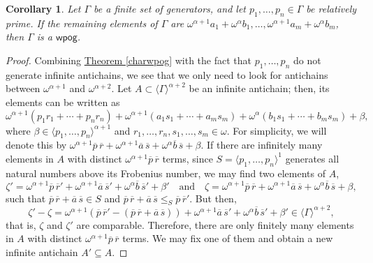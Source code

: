 \documentclass[reqno]{amsart}
\newtheorem{corollary}[theorem]{Corollary}
\theoremstyle{definition}
\theoremstyle{definition}
\theoremstyle{plain} %
\begin{document}
\begin{corollary}
    Let $\Gamma$ be a finite set of generators, and let $ p_1, \dots,p_n \in \Gamma$ be relatively prime. If the remaining elements of $\Gamma$ are $\omega^{\alpha+1} a_1 + \omega^{\alpha} b_1, \dots, \omega^{\alpha+1} a_m + \omega^{\alpha} b_m$, then $\Gamma$ is a $\mathsf{wpog}$.
\end{corollary}
\begin{proof}
    Combining \hyperref[charwpog]{Theorem \ref{charwpog}} with the fact that $p_1, \dots,p_n$ do not generate infinite antichains, we see that we only need to look for antichains between $\omega^{\alpha+1}$ and $\omega^{\alpha+2}$. Let $A \subset \langle \Gamma \rangle^{\alpha+2}$ be an infinite antichain; then, its elements can be written as \[ \omega^{\alpha+1}(p_1 r_1 + \cdots + p_n r_n)+\omega^{\alpha+1}(a_1 s_1 + \cdots + a_m s_m)+\omega^{\alpha}(b_1 s_1 + \cdots + b_m s_m)+\beta,\]where $\beta \in \langle p_1,\dots,p_n \rangle^{\alpha+1}$ and $r_1,\dots,r_n, s_1,\dots,s_m \in \omega$. For simplicity, we will denote this by \( \omega^{\alpha+1}\overline{p}\,\overline{r}+\omega^{\alpha+1}\overline{a}\,\overline{s}+\omega^{\alpha}\overline{b}\,\overline{s}+\beta\). If there are infinitely many elements in $A$ with distinct $\omega^{\alpha+1}\overline{p}\,\overline{r}$ terms, since  $S=\langle p_1,\dots,p_n\rangle^{1}$  generates all natural numbers above its Frobenius number, we may find two elements of $A$, \[ \zeta'=\omega^{\alpha+1}\overline{p}\,\overline{r}'+ \omega^{\alpha+1}\overline{a}\,\overline{s}' + \omega^{\alpha}\overline{b}\,\overline{s}' + \beta'\quad\text{and}\quad\zeta=\omega^{\alpha+1}\overline{p}\,\overline{r}+\omega^{\alpha+1}\overline{a}\,\overline{s}+ \omega^{\alpha}\overline{b}\,\overline{s}+\beta,\]such that \(\overline{p}\,\overline{r}+\overline{a}\,\overline{s} \in S\) and $ \overline{p}\,\overline{r}+\overline{a}\,\overline{s}\leq_{S} \overline{p}\,\overline{r}'$. But then, \[ \zeta' - \zeta=\omega^{\alpha+1}(\overline{p}\,\overline{r}'-(\overline{p}\,\overline{r}+\overline{a}\,\overline{s}))+ \omega^{\alpha+1}\overline{a}\,\overline{s}'+ \omega^{\alpha}\overline{b}\,\overline{s}'+ \beta'\in \langle \Gamma \rangle^{\alpha+2},\]that is, $\zeta$ and $\zeta'$ are comparable. Therefore, there are only finitely many elements in $A$ with distinct $\omega^{\alpha+1}\overline{p}\,\overline{r}$ terms. We may fix one of them and obtain a new infinite antichain $A' \subseteq A$.


\end{proof}
\end{document}
